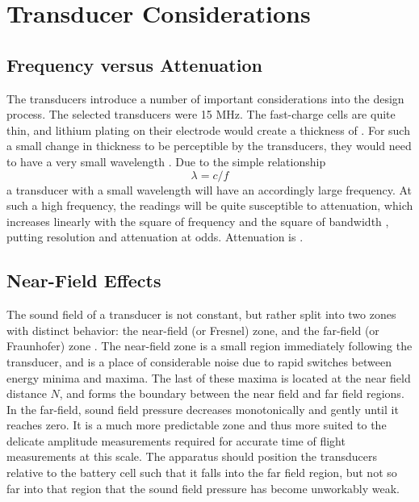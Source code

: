 \section{Transducer Considerations}
\subsection{Frequency versus Attenuation}
The transducers introduce a number of important considerations into the design process.
The selected transducers were 15 MHz. The fast-charge cells are quite thin, and lithium plating on their electrode would create a thickness of . 
For such a small change in thickness to be perceptible by the transducers, they would need to have a very small wavelength . Due to the simple relationship 
$$ \lambda = c/f$$
a transducer with a small wavelength will have an accordingly large frequency. At such a high frequency, the readings will be quite susceptible to attenuation, which increases linearly with the square of frequency and the square of bandwidth \cite{OLYMPUS}, putting resolution and attenuation at odds. Attenuation is .

\subsection{Near-Field Effects}
The sound field of a transducer is not constant, but rather split into two zones with distinct behavior: the near-field (or Fresnel) zone, and the far-field (or Fraunhofer) zone \cite{OLYMPUS}. 
The near-field zone is a small region immediately following the transducer, and is a place of considerable noise due to rapid switches between energy minima and maxima. 
The last of these maxima is located at the near field distance $N$, and forms the boundary between the near field and far field regions. \cite{OLYMPUS}
In the far-field, sound field pressure decreases monotonically and gently until it reaches zero. \cite{OLYMPUS}
It is a much more predictable zone and thus more suited to the delicate amplitude measurements required for accurate time of flight measurements at this scale.
The apparatus should position the transducers relative to the battery cell such that it falls into the far field region, but not so far into that region that the sound field pressure has become unworkably weak.

